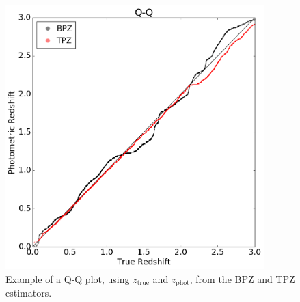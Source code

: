 \documentclass[DM,lsstdraft,toc]{lsstdoc}
\begin{document}
\begin{figure}
\begin{center}
\includegraphics[width=10cm]{figures/qq_BPZ_TPZ.png}
\caption{Example of a Q-Q plot, using $z_\mathrm{true}$ and $z_\mathrm{phot}$, from the BPZ and TPZ estimators.}\label{fig:qq}
\end{center}
\end{figure}

\clearpage


\end{document}
